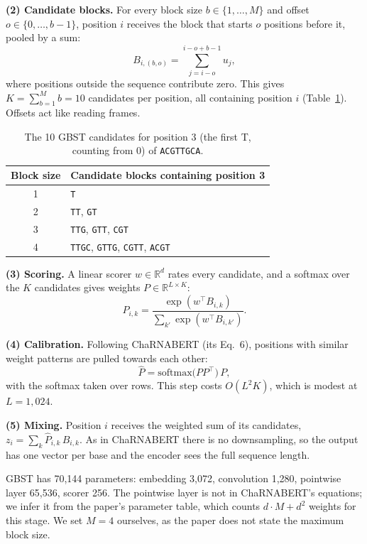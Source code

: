 \documentclass{article}
\begin{document}
\textbf{(2) Candidate blocks.} For every block size $b\in\{1,\dots,M\}$ and offset $o\in\{0,\dots,b-1\}$,
position $i$ receives the block that starts $o$ positions before it, pooled by a sum:
\begin{equation}
  B_{i,(b,o)} = \sum_{j=i-o}^{i-o+b-1} u_j ,
\end{equation}
where positions outside the sequence contribute zero. This gives $K=\sum_{b=1}^{M} b=10$ candidates per
position, all containing position $i$ (Table~\ref{tab:cand}). Offsets act like reading frames.

\begin{table}[h]
  \caption{The 10 GBST candidates for position 3 (the first T, counting from 0) of \texttt{ACGTTGCA}.}
  \label{tab:cand}
  \centering
  \small
  \begin{tabular}{cl}
    \toprule
    Block size & Candidate blocks containing position 3 \\
    \midrule
    1 & \texttt{T} \\
    2 & \texttt{TT}, \texttt{GT} \\
    3 & \texttt{TTG}, \texttt{GTT}, \texttt{CGT} \\
    4 & \texttt{TTGC}, \texttt{GTTG}, \texttt{CGTT}, \texttt{ACGT} \\
    \bottomrule
  \end{tabular}
\end{table}

\textbf{(3) Scoring.} A linear scorer $w\in\mathbb{R}^d$ rates every candidate, and a softmax over the
$K$ candidates gives weights $P\in\mathbb{R}^{L\times K}$:
\begin{equation}
  P_{i,k} = \frac{\exp(w^\top B_{i,k})}{\sum_{k'}\exp(w^\top B_{i,k'})}.
\end{equation}

\textbf{(4) Calibration.} Following ChaRNABERT (its Eq.~6), positions with similar weight patterns are
pulled towards each other:
\begin{equation}
  \hat P = \mathrm{softmax}\big(PP^\top\big)\,P ,
\end{equation}
with the softmax taken over rows. This step costs $O(L^2K)$, which is modest at $L=1{,}024$.

\textbf{(5) Mixing.} Position $i$ receives the weighted sum of its candidates,
$z_i=\sum_{k}\hat P_{i,k}\,B_{i,k}$. As in ChaRNABERT there is no downsampling, so the output has one
vector per base and the encoder sees the full sequence length.

GBST has 70,144 parameters: embedding 3,072, convolution 1,280, pointwise layer 65,536, scorer 256.
The pointwise layer is not in ChaRNABERT's equations; we infer it from the paper's parameter table,
which counts $d\cdot M+d^2$ weights for this stage. We set $M=4$ ourselves, as the paper does not state the maximum block size.
\end{document}
